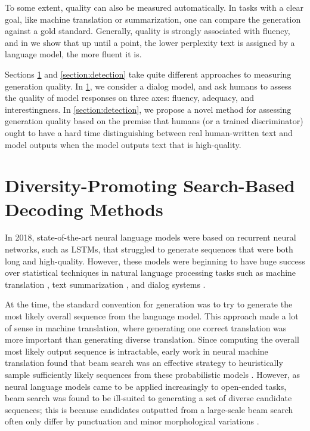 To some extent, quality can also be measured automatically.
In tasks with a clear goal, like machine translation or summarization, one can compare the generation against a gold standard.
Generally, quality is strongly associated with fluency, and in  we show that up until a point, the lower perplexity text is assigned by a language model, the more fluent it is.

Sections \ref{section:dediv} and \ref{section:detection} take quite different approaches to measuring generation quality.
In \ref{section:dediv}, we consider a dialog model, and ask humans to assess the quality of model responses on three axes: fluency, adequacy, and interestingness.
In  \ref{section:detection}, we propose a novel method for assessing generation quality based on the premise that humans (or a trained discriminator) ought to have a hard time distinguishing between real human-written text and model outputs when the model outputs text that is high-quality.

\iffalse
\section{Diversity-Promoting Search-Based Decoding Methods}
\label{section:dediv}

In 2018, state-of-the-art neural language models were based on recurrent neural networks, such as LSTMs, that struggled to generate sequences that were both long and high-quality.
However, these models were beginning to have huge success over statistical techniques in natural language processing tasks such as machine translation \cite{sutskever2014sequence,Luong2015EffectiveAT}, text summarization \cite{Nallapati2016AbstractiveTS}, and dialog systems \cite{vinyals2015neural}.

At the time, the standard convention for generation was to try to generate the most likely overall sequence from the language model.
This approach made a lot of sense in machine translation, where generating one correct translation was more important than generating diverse translation.
Since computing the overall most likely output sequence is intractable, early work in neural machine translation found that beam search was an effective strategy to heuristically sample sufficiently likely sequences from these probabilistic models \cite{sutskever2014sequence}.
However, as neural language models came to be applied increasingly to open-ended tasks, beam search was found to be ill-suited to generating a set of diverse candidate sequences; this is because candidates outputted from a large-scale beam search often only differ by punctuation and minor morphological variations \cite{li2016mutual}.

